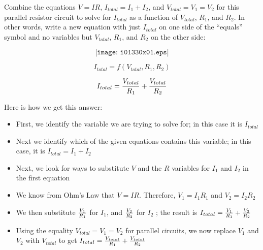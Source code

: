 

Combine the equations $V = IR$, $I_{total} = I_1 + I_2$, and $V_{total} = V_1 = V_2$ for this parallel resistor circuit to solve for $I_{total}$ as a function of $V_{total}$, $R_1$, and $R_2$.  In other words, write a new equation with just $I_{total}$ on one side of the ``equals'' symbol and no variables but $V_{total}$, $R_1$, and $R_2$ on the other side:

$$\texttt{[image: i01330x01.eps]}$$

$$I_{total} = f(V_{total}, R_1, R_2)$$







$$I_{total} = {V_{total} \over R_1} + {V_{total} \over R_2}$$

Here is how we get this answer:

\begin{itemize}
\item{} First, we identify the variable we are trying to solve for; in this case it is $I_{total}$
\vskip 10pt
\item{} Next we identify which of the given equations contains this variable; in this case, it is $I_{total} = I_1 + I_2$
\vskip 10pt
\item{} Next, we look for ways to substitute $V$ and the $R$ variables for $I_1$ and $I_2$ in the first equation
\vskip 10pt
\item{} We know from Ohm's Law that $V = IR$.  Therefore, $V_1 = I_1 R_1$ and $V_2 = I_2 R_2$
\vskip 10pt
\item{} We then substitute $V_1 \over R_1$ for $I_1$, and $V_2 \over R_2$ for $I_2$ ; the result is $I_{total} = {V_1 \over R_1} + {V_2 \over R_2}$
\vskip 10pt
\item{} Using the equality $V_{total} = V_1 = V_2$ for parallel circuits, we now replace $V_1$ and $V_2$ with $V_{total}$ to get $I_{total} = {V_{total} \over R_1} + {V_{total} \over R_2}$
\end{itemize}












